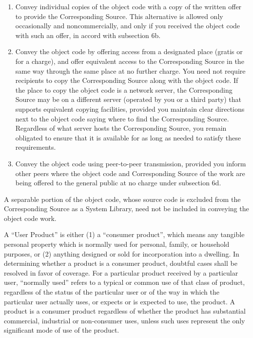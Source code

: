 \documentclass[10pt,a4paper,ngerman,titlepage,tocindentauto]{article}
\begin{document}
\begin{multicols}{3}
{\begin{enumerate}
\begin{enumerate}
					  \item Convey individual copies of the object code with a copy of the
					  written offer to provide the Corresponding Source.  This
					  alternative is allowed only occasionally and noncommercially, and
					  only if you received the object code with such an offer, in accord
					  with subsection 6b.

					  \item Convey the object code by offering access from a designated
					  place (gratis or for a charge), and offer equivalent access to the
					  Corresponding Source in the same way through the same place at no
					  further charge.  You need not require recipients to copy the
					  Corresponding Source along with the object code.  If the place to
					  copy the object code is a network server, the Corresponding Source
					  may be on a different server (operated by you or a third party)
					  that supports equivalent copying facilities, provided you maintain
					  clear directions next to the object code saying where to find the
					  Corresponding Source.  Regardless of what server hosts the
					  Corresponding Source, you remain obligated to ensure that it is
					  available for as long as needed to satisfy these requirements.

					  \item Convey the object code using peer-to-peer transmission, provided
					  you inform other peers where the object code and Corresponding
					  Source of the work are being offered to the general public at no
					  charge under subsection 6d.
					  \end{enumerate}

					A separable portion of the object code, whose source code is excluded
					from the Corresponding Source as a System Library, need not be
					included in conveying the object code work.

					A ``User Product'' is either (1) a ``consumer product'', which means any
					tangible personal property which is normally used for personal, family,
					or household purposes, or (2) anything designed or sold for incorporation
					into a dwelling.  In determining whether a product is a consumer product,
					doubtful cases shall be resolved in favor of coverage.  For a particular
					product received by a particular user, ``normally used'' refers to a
					typical or common use of that class of product, regardless of the status
					of the particular user or of the way in which the particular user
					actually uses, or expects or is expected to use, the product.  A product
					is a consumer product regardless of whether the product has substantial
					commercial, industrial or non-consumer uses, unless such uses represent
					the only significant mode of use of the product.


\end{enumerate}}
\end{multicols}
\end{document}
